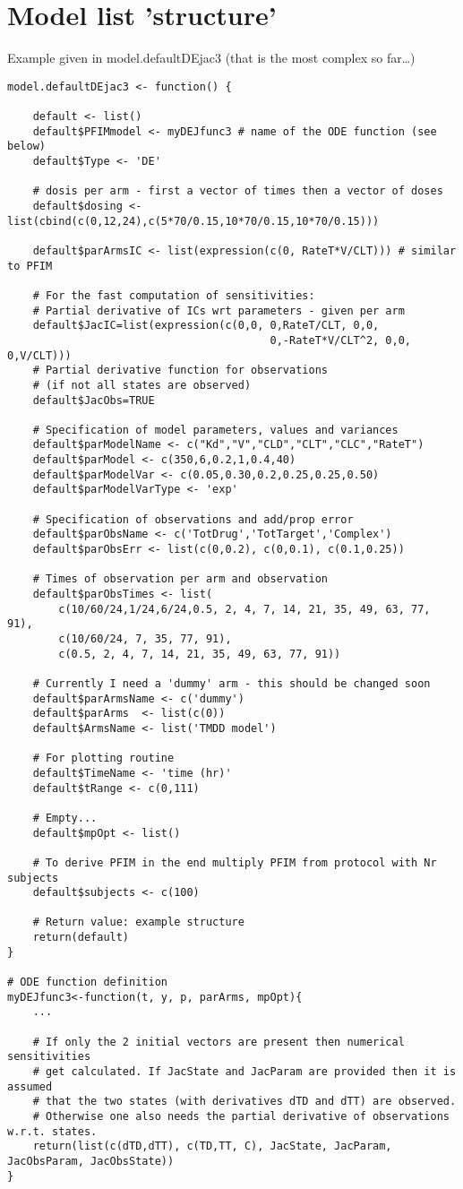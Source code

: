 \section{Model list 'structure'}

Example given in model.defaultDEjac3 (that is the most complex so far\dots)

\begin{verbatim}
model.defaultDEjac3 <- function() {

	default <- list()
	default$PFIMmodel <- myDEJfunc3 # name of the ODE function (see below)
	default$Type <- 'DE'

	# dosis per arm - first a vector of times then a vector of doses
	default$dosing <- list(cbind(c(0,12,24),c(5*70/0.15,10*70/0.15,10*70/0.15)))

	default$parArmsIC <- list(expression(c(0, RateT*V/CLT))) # similar to PFIM

	# For the fast computation of sensitivities:
	# Partial derivative of ICs wrt parameters - given per arm
	default$JacIC=list(expression(c(0,0, 0,RateT/CLT, 0,0, 
	                                     0,-RateT*V/CLT^2, 0,0, 0,V/CLT)))
	# Partial derivative function for observations
	# (if not all states are observed)
	default$JacObs=TRUE

	# Specification of model parameters, values and variances
	default$parModelName <- c("Kd","V","CLD","CLT","CLC","RateT")
	default$parModel <- c(350,6,0.2,1,0.4,40)
	default$parModelVar <- c(0.05,0.30,0.2,0.25,0.25,0.50)
	default$parModelVarType <- 'exp'

	# Specification of observations and add/prop error
	default$parObsName <- c('TotDrug','TotTarget','Complex')
	default$parObsErr <- list(c(0,0.2), c(0,0.1), c(0.1,0.25))

	# Times of observation per arm and observation
	default$parObsTimes <- list(
	    c(10/60/24,1/24,6/24,0.5, 2, 4, 7, 14, 21, 35, 49, 63, 77, 91),
	    c(10/60/24, 7, 35, 77, 91),
	    c(0.5, 2, 4, 7, 14, 21, 35, 49, 63, 77, 91))

	# Currently I need a 'dummy' arm - this should be changed soon
	default$parArmsName <- c('dummy')
	default$parArms  <- list(c(0))
	default$ArmsName <- list('TMDD model')

	# For plotting routine
	default$TimeName <- 'time (hr)'
	default$tRange <- c(0,111)

	# Empty...
	default$mpOpt <- list()

	# To derive PFIM in the end multiply PFIM from protocol with Nr subjects
	default$subjects <- c(100)

	# Return value: example structure
	return(default)
}

# ODE function definition
myDEJfunc3<-function(t, y, p, parArms, mpOpt){
	...

	# If only the 2 initial vectors are present then numerical sensitivities
	# get calculated. If JacState and JacParam are provided then it is assumed
	# that the two states (with derivatives dTD and dTT) are observed.
	# Otherwise one also needs the partial derivative of observations w.r.t. states.
	return(list(c(dTD,dTT), c(TD,TT, C), JacState, JacParam, JacObsParam, JacObsState))
}
\end{verbatim}

